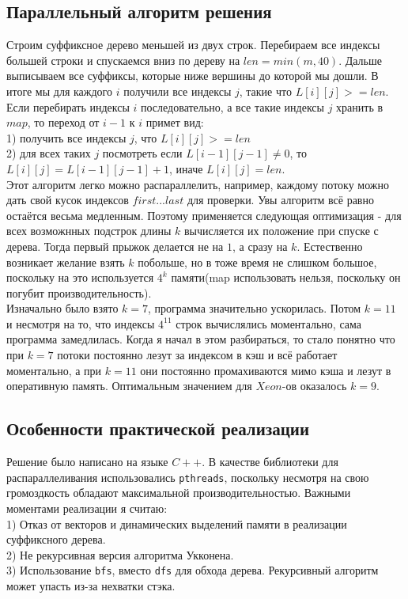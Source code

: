 \documentclass[12pt,a4paper]{article}
\begin{document}
\subsection{Параллельный алгоритм решения}
Строим суффиксное дерево меньшей из двух строк. Перебираем все индексы большей строки и спускаемся вниз по дереву на 
$len = min(m, 40)$. Дальше выписываем все суффиксы, которые ниже вершины до которой мы дошли. В итоге мы для каждого $i$ получили все индексы $j$, такие что $L[i][j]>=len$. Если перебирать индексы $i$ последовательно, а все такие индексы $j$ хранить в $map$, то переход от $i-1$ к $i$ примет вид:
\\
1) получить все индексы $j$, что $L[i][j]>=len$
\\
2) для всех таких $j$ посмотреть если $L[i-1][j-1] \neq 0$, то $L[i][j] = L[i-1][j-1]+1$, иначе $L[i][j] = len$. 
\\
Этот алгоритм легко можно распараллелить, например, каждому потоку можно дать свой кусок индексов $first...last$ для проверки. Увы алгоритм всё равно остаётся весьма медленным. Поэтому применяется следующая оптимизация - для всех возможнных подстрок длины $k$ вычисляется их положение при спуске с дерева. Тогда первый прыжок делается не на $1$, а сразу на $k$. Естественно возникает желание взять $k$ побольше, но в тоже время не слишком большое, поскольку на это используется $4^k$ памяти(map использовать нельзя, поскольку он погубит производительность).
\\
Изначально было взято $k=7$, программа значительно ускорилась. Потом $k=11$ и несмотря на то, что индексы $4^{11}$ строк вычислялись моментально, сама программа замедлилась. Когда я начал в этом разбираться, то стало понятно что при $k=7$ потоки постоянно лезут за индексом в кэш и всё работает моментально, а при $k=11$ они постоянно промахиваются мимо кэша и лезут в оперативную память. Оптимальным значением для $Xeon$-ов оказалось $k=9$.

\subsection{Особенности практической реализации}
Решение было написано на языке $C++$. В качестве библиотеки для распараллеливания использовались \texttt{pthreads}, поскольку несмотря на свою громоздкость обладают максимальной производительностью.
Важными моментами реализации я считаю:
\\
1) Отказ от векторов и динамических выделений памяти в реализации суффиксного дерева.
\\
2) Не рекурсивная версия алгоритма Укконена.
\\
3) Использование \texttt{bfs}, вместо \texttt{dfs} для обхода дерева. Рекурсивный алгоритм может упасть из-за нехватки стэка.
\end{document}
